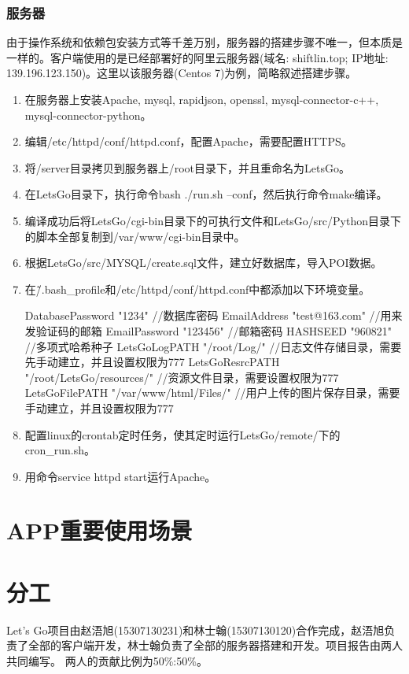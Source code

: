 \documentclass[UTF8]{article}
\begin{document}
\subsubsection{服务器}
由于操作系统和依赖包安装方式等千差万别，服务器的搭建步骤不唯一，但本质是一样的。客户端使用的是已经部署好的阿里云服务器(域名: shiftlin.top; IP地址: 139.196.123.150)。这里以该服务器(Centos 7)为例，简略叙述搭建步骤。
\begin{enumerate}
    \item 在服务器上安装Apache, mysql, rapidjson, openssl, mysql-connector-c++, mysql-connector-python。
    \item 编辑/etc/httpd/conf/httpd.conf，配置Apache，需要配置HTTPS。
    \item 将/server目录拷贝到服务器上/root目录下，并且重命名为LetsGo。
    \item 在LetsGo目录下，执行命令bash ./run.sh --conf，然后执行命令make编译。
    \item 编译成功后将LetsGo/cgi-bin目录下的可执行文件和LetsGo/src/Python目录下的脚本全部复制到/var/www/cgi-bin目录中。
    \item 根据LetsGo/src/MYSQL/create.sql文件，建立好数据库，导入POI数据。
    \item 在\~/.bash_profile和/etc/httpd/conf/httpd.conf中都添加以下环境变量。\\
    \begin{tcolorbox}[colback=white]
        DatabasePassword "1234" //数据库密码 
        EmailAddress "test@163.com" //用来发验证码的邮箱
        EmailPassword "123456" //邮箱密码
        HASHSEED "960821" //多项式哈希种子
        LetsGoLogPATH "/root/Log/" //日志文件存储目录，需要先手动建立，并且设置权限为777
        LetsGoResrcPATH "/root/LetsGo/resources/" //资源文件目录，需要设置权限为777
        LetsGoFilePATH "/var/www/html/Files/" //用户上传的图片保存目录，需要手动建立，并且设置权限为777
    \end{tcolorbox}
    \item 配置linux的crontab定时任务，使其定时运行LetsGo/remote/下的cron_run.sh。
    \item 用命令service httpd start运行Apache。
\end{enumerate}

\section{APP重要使用场景}



\section{分工}
Let's Go项目由赵浯旭(15307130231)和林士翰(15307130120)合作完成，赵浯旭负责了全部的客户端开发，林士翰负责了全部的服务器搭建和开发。项目报告由两人共同编写。
两人的贡献比例为50\%:50\%。
\end{document}
